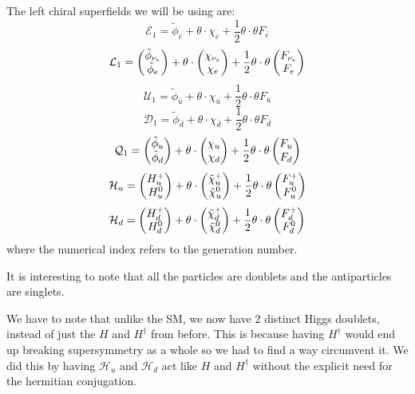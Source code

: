   The left chiral superfields we will be using are:
  \begin{equation}
    \mathcal{E}_1 = \tilde{\phi}_{\bar{e}} + \theta \cdot \chi_{\bar{e}} + \frac{1}{2} \theta\cdot\theta F_{\bar{e}}
  \end{equation}
  \begin{equation}
    \mathcal{L}_1 = \begin{pmatrix}{\tilde{\phi}_{\nu_e}}\\{\tilde{\phi}_e}\end{pmatrix} + \theta \cdot \begin{pmatrix}{\chi_{\nu_e}}\\{\chi_e}\end{pmatrix} + \frac{1}{2} \theta\cdot\theta \begin{pmatrix}{F_{\nu_e}}\\{F_e}\end{pmatrix}
  \end{equation}
  \begin{equation}
    \mathcal{U}_1 = \tilde{\phi}_{\bar{u}} + \theta\cdot\chi_{\bar{u}} + \frac{1}{2} \theta\cdot\theta F_{\bar{u}}
  \end{equation}
  \begin{equation}
    \mathcal{D}_1 = \tilde{\phi}_{\bar{d}} + \theta\cdot\chi_{\bar{d}} + \frac{1}{2} \theta\cdot\theta F_{\bar{d}}
  \end{equation}
  \begin{equation}
    \mathcal{Q}_1 = \begin{pmatrix}{\tilde{\phi}_u}\\{\tilde{\phi}_d}\end{pmatrix} + \theta\cdot\begin{pmatrix}{\chi_u}\\{\chi_d}\end{pmatrix} + \frac{1}{2}\theta\cdot\theta \begin{pmatrix}{F_u}\\{F_d}\end{pmatrix}
  \end{equation}
  \begin{equation}
    \mathcal{H}_u = \begin{pmatrix}{H^+_u}\\{H^0_u}\end{pmatrix} + \theta\cdot\begin{pmatrix}{\tilde{\chi}^+_u}\\{\tilde{\chi}^0_u}\end{pmatrix} + \frac{1}{2}\theta\cdot\theta\begin{pmatrix}{F^+_u}\\{F^0_u}\end{pmatrix}
  \end{equation}
  \begin{equation}
    \mathcal{H}_d = \begin{pmatrix}{H^+_d}\\{H^0_d}\end{pmatrix} + \theta\cdot\begin{pmatrix}{\tilde{\chi}^+_d}\\{\tilde{\chi}^0_d}\end{pmatrix} + \frac{1}{2}\theta\cdot\theta\begin{pmatrix}{F^+_d}\\{F^0_d}\end{pmatrix}
  \end{equation}
  where the numerical index refers to the generation number.

  It is interesting to note that all the particles are doublets and the antiparticles are singlets.

  We have to note that unlike the SM, we now have 2 distinct Higgs doublets, instead of just the $H$ and $H^\dagger$ from before. This is because having $H^\dagger$ would end up breaking supersymmetry as a whole so we had to find a way circumvent it. We did this by having $\mathcal{H}_u$ and $\mathcal{H}_d$ act like $H$ and $H^\dagger$ without the explicit need for the hermitian conjugation.

